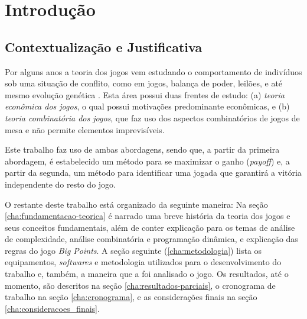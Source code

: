 \chapter[Introdução]{Introdução}
\label{introduc}

\section{Contextualização e Justificativa}

Por alguns anos a teoria dos jogos vem estudando o comportamento de
indivíduos sob uma situação de conflito, como em jogos, balança de
poder, leilões, e até mesmo evolução
genética \cite{sartini_IIbienaldasbm}. Esta área possui duas frentes de
estudo: (a) \emph{teoria econômica dos jogos}, o qual possui motivações
predominante econômicas, e (b) \emph{teoria combinatória dos jogos}, que
faz uso dos aspectos combinatórios de jogos de mesa e não permite
elementos imprevisíveis.

Este trabalho faz uso de ambas abordagens, sendo que, a partir da
primeira abordagem, é estabelecido um método para se maximizar o ganho
(\emph{payoff}) e, a partir da segunda, um método para identificar uma
jogada que garantirá a vitória independente do resto do jogo.

O restante deste trabalho está organizado da seguinte maneira: Na seção
\ref{cha:fundamentacao-teorica} é narrado uma breve
história da teoria dos jogos e seus conceitos fundamentais, além de
conter explicação para os temas de análise de complexidade, análise
combinatória e programação dinâmica, e explicação das regras do jogo
\emph{Big Points}. A seção seguinte (\ref{cha:metodologia}) lista os
equipamentos, \textit{softwares} e metodologia utilizados para o desenvolvimento
do trabalho e, também, a maneira que a foi analisado o jogo. Os resultados,
até o momento, são descritos na seção \ref{cha:resultados-parciais}, o
cronograma de trabalho na seção \ref{cha:cronograma}, e as considerações
finais na seção \ref{cha:consideracoes_finais}.
